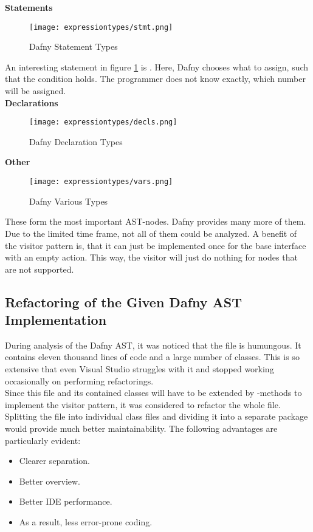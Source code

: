 \pagebreak
\textbf{Statements}\\
\begin{figure}[H]
    \centering
    \texttt{[image: expressiontypes/stmt.png]}
    \caption{Dafny Statement Types}
    \label{fig:dafny_stmt}
\end{figure}

An interesting statement in figure \ref{fig:dafny_stmt} is .
Here, Dafny chooses what to assign, such that the condition holds.
The programmer does not know exactly, which number will be assigned.\\

\textbf{Declarations}\\
\begin{figure}[H]
    \centering
    \texttt{[image: expressiontypes/decls.png]}
    \caption{Dafny Declaration Types}
    \label{fig:dafny_decl}
\end{figure}

\pagebreak
\textbf{Other}
\begin{figure}[H]
    \centering
    \texttt{[image: expressiontypes/vars.png]}
    \caption{Dafny Various Types}
    \label{fig:dafny_vars}
\end{figure}

These form the most important AST-nodes.
Dafny provides many more of them.
Due to the limited time frame, not all of them could be analyzed.
A benefit of the visitor pattern is, that it can just be implemented once for the base interface  with an empty action.
This way, the visitor will just do nothing for nodes that are not supported.

\subsection{Refactoring of the Given Dafny AST Implementation}
During analysis of the Dafny AST, it was noticed that the file  is humungous.
It contains eleven thousand lines of code and a large number of classes.
This is so extensive that even Visual Studio struggles with it and stopped working occasionally on performing refactorings.\\

Since this file and its contained classes will have to be extended by -methods
to implement the visitor pattern, it was considered to refactor the whole file.\\

Splitting the file into individual class files and dividing it into a separate package would provide much better maintainability.
The following advantages are particularly evident:
\begin{itemize}
    \item Clearer separation.
    \item Better overview.
    \item Better IDE performance.
    \item As a result, less error-prone coding.
\end{itemize}

